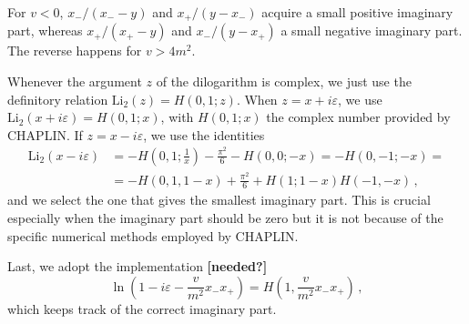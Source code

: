 \documentclass[12pt,a4wide]{article}
\begin{document}
For $v<0$, $x_-/(x_--y)$ and $x_+/(y-x_-)$ acquire a small positive imaginary part, whereas $x_+/(x_+-y)$ and $x_-/(y-x_+)$ a small negative imaginary part. The reverse happens for $v>4m^2$.

Whenever the argument $z$ of the dilogarithm is complex, we just use the
definitory relation $\mathrm{Li_2}(z)=H(0,1;z)$. When $z=x+i\varepsilon$, we use $\mathrm{Li_2}(x+i\varepsilon)=H(0,1;x)$, with $H(0,1;x)$ the complex number provided by CHAPLIN. If $z=x-i\varepsilon$, we use the identities
\begin{equation}
  \begin{split}
\mathrm{Li}_{2}\left ( x-i\varepsilon \right )&= -H\left(0,1;\frac{1}{x} \right ) - \frac{\pi^2}{6} - H(0,0; -x)  = -H(0,-1;-x) = \\ & 
= -H\left (0,1, 1-x \right )+ \frac{\pi^2}{6} + H(1;1-x) H(-1,-x)\,,
  \end{split}
\end{equation}
and we select the one that gives the smallest imaginary part. This is
crucial especially when the imaginary part should be zero but it is
not because of the specific numerical methods employed by CHAPLIN.

Last, we adopt the implementation {\bf [needed?]}
\begin{equation}
  \label{eq:log-implemented}
  \ln\left ( 1 - i \varepsilon - \frac{v}{m^2}x_-x_+ \right ) =H\left(1,\frac{v}{m^2}x_-x_+\right)\,,
\end{equation}
which keeps track of the correct imaginary part.
 
\end{document}
